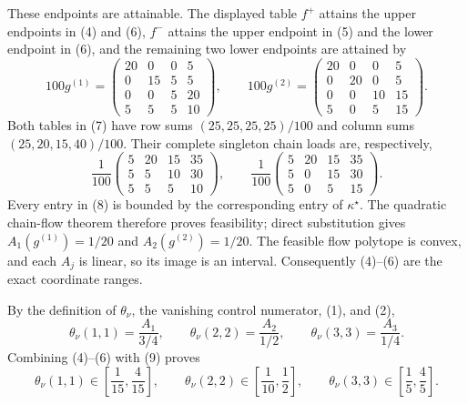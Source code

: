 These endpoints are attainable.  The displayed table \(f^+\) attains the upper endpoints in (4) and (6), \(f^-\) attains the upper endpoint in (5) and the lower endpoint in (6), and the remaining two lower endpoints are attained by
\[
100g^{(1)}=
\begin{pmatrix}
20&0&0&5\\
0&15&5&5\\
0&0&5&20\\
5&5&5&10
\end{pmatrix},
\qquad
100g^{(2)}=
\begin{pmatrix}
20&0&0&5\\
0&20&0&5\\
0&0&10&15\\
5&0&5&15
\end{pmatrix}. \tag{7}
\]
Both tables in (7) have row sums \((25,25,25,25)/100\) and column sums \((25,20,15,40)/100\).  Their complete singleton chain loads are, respectively,
\[
\frac1{100}
\begin{pmatrix}
5&20&15&35\\
5&5&10&30\\
5&5&5&10
\end{pmatrix},
\qquad
\frac1{100}
\begin{pmatrix}
5&20&15&35\\
5&0&15&30\\
5&0&5&15
\end{pmatrix}. \tag{8}
\]
Every entry in (8) is bounded by the corresponding entry of \(\kappa^\star\).  The quadratic chain-flow theorem therefore proves feasibility; direct substitution gives \(A_1(g^{(1)})=1/20\) and \(A_2(g^{(2)})=1/20\).  The feasible flow polytope is convex, and each \(A_j\) is linear, so its image is an interval.  Consequently (4)--(6) are the exact coordinate ranges.

By the definition of \(\theta_\nu\), the vanishing control numerator, (1), and (2),
\[
 \theta_\nu(1,1)=\frac{A_1}{3/4},\qquad
 \theta_\nu(2,2)=\frac{A_2}{1/2},\qquad
 \theta_\nu(3,3)=\frac{A_3}{1/4}. \tag{9}
\]
Combining (4)--(6) with (9) proves
\[
 \theta_\nu(1,1)\in\left[\frac1{15},\frac4{15}\right],\qquad
 \theta_\nu(2,2)\in\left[\frac1{10},\frac12\right],\qquad
 \theta_\nu(3,3)\in\left[\frac15,\frac45\right]. \tag{10}
\]

